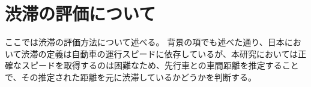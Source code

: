 
\section{渋滞の評価について}
ここでは渋滞の評価方法について述べる。
背景の項でも述べた通り、日本において渋滞の定義は自動車の運行スピードに依存しているが、本研究においては正確なスピードを取得するのは困難なため、先行車との車間距離を推定することで、その推定された距離を元に渋滞しているかどうかを判断する。

